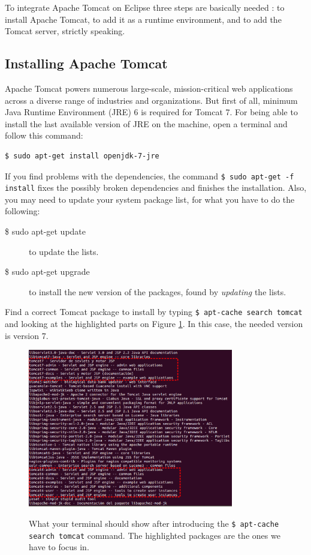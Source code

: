 \documentclass[a4paper,11pt]{book}
\begin{document}
To integrate Apache Tomcat on Eclipse three steps are basically needed \cite{eclipsetomcat:site}: to install Apache Tomcat, to add it as a runtime environment, and to add the Tomcat server, strictly speaking.

\subsection{Installing Apache Tomcat}
\label{subsec:installapache}

Apache Tomcat powers numerous large-scale, mission-critical web applications across a diverse range of industries and organizations. But first of all, minimum Java Runtime Environment (JRE) 6 is required for Tomcat 7. For being able to install the last available version of JRE on the machine, open a terminal and follow this command:

\begin{verbatim}
$ sudo apt-get install openjdk-7-jre
\end{verbatim}

If you find problems with the dependencies, the command \texttt{\$ sudo apt-get -f install} fixes the possibly broken dependencies and finishes the installation. Also, you may need to update your system package list, for what you have to do the following:

\begin{description}
  \item[\$ sudo apt-get update] to update the lists.
  \item[\$ sudo apt-get upgrade] to install the new version of the packages, found by \textit{updating} the lists.
\end{description}

Find a correct Tomcat package to install by typing \texttt{\$ apt-cache search tomcat} and looking at the highlighted parts on Figure \ref{fig:tomcatpackages}. In this case, the needed version is version 7.

\begin{figure}
  \begin{center}
    \includegraphics[width=0.8\textwidth]{./Figures/tomcatpackages.png}
    \label{fig:tomcatpackages}
    \caption{What your terminal should show after introducing the \texttt{\$ apt-cache search tomcat} command. The highlighted packages are the ones we have to focus in.}
  \end{center}
\end{figure}
\end{document}
